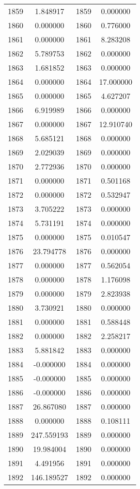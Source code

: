 \documentclass[12pt]{article}
\begin{document}
\begin{longtable}{@{}cccc@{}}
1859 & 1.848917 & 1859 & 0.000000 \\
1860 & 0.000000 & 1860 & 0.776000 \\
1861 & 0.000000 & 1861 & 8.283208 \\
1862 & 5.789753 & 1862 & 0.000000 \\
1863 & 1.681852 & 1863 & 0.000000 \\
1864 & 0.000000 & 1864 & 17.000000 \\
1865 & 0.000000 & 1865 & 4.627207 \\
1866 & 6.919989 & 1866 & 0.000000 \\
1867 & 0.000000 & 1867 & 12.910740 \\
1868 & 5.685121 & 1868 & 0.000000 \\
1869 & 2.029039 & 1869 & 0.000000 \\
1870 & 2.772936 & 1870 & 0.000000 \\
1871 & 0.000000 & 1871 & 0.501168 \\
1872 & 0.000000 & 1872 & 0.532947 \\
1873 & 3.705222 & 1873 & 0.000000 \\
1874 & 5.731191 & 1874 & 0.000000 \\
1875 & 0.000000 & 1875 & 0.010547 \\
1876 & 23.794778 & 1876 & 0.000000 \\
1877 & 0.000000 & 1877 & 0.562054 \\
1878 & 0.000000 & 1878 & 1.176098 \\
1879 & 0.000000 & 1879 & 2.823938 \\
1880 & 3.730921 & 1880 & 0.000000 \\
1881 & 0.000000 & 1881 & 0.588448 \\
1882 & 0.000000 & 1882 & 2.258217 \\
1883 & 5.881842 & 1883 & 0.000000 \\
1884 & -0.000000 & 1884 & 0.000000 \\
1885 & -0.000000 & 1885 & 0.000000 \\
1886 & -0.000000 & 1886 & 0.000000 \\
1887 & 26.867080 & 1887 & 0.000000 \\
1888 & 0.000000 & 1888 & 0.108111 \\
1889 & 247.559193 & 1889 & 0.000000 \\
1890 & 19.984004 & 1890 & 0.000000 \\
1891 & 4.491956 & 1891 & 0.000000 \\
1892 & 146.189527 & 1892 & 0.000000 \\

\end{longtable}
\end{document}
